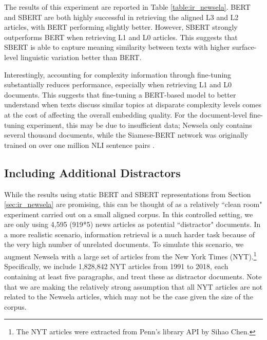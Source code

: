 \documentclass[thesis.tex]{subfiles}
\begin{document}
The results of this experiment are reported in Table \ref{table:ir_newsela}. BERT and SBERT are both highly successful in retrieving the aligned L3 and L2 articles, with BERT performing slightly better. However, SBERT strongly outperforms BERT when retrieving L1 and L0 articles. This suggests that SBERT is able to capture meaning similarity between texts with higher surface-level linguistic variation better than BERT.

Interestingly, accounting for complexity information through fine-tuning substantially reduces performance, especially when retrieving L1 and L0 documents. This suggests that fine-tuning a BERT-based model to better understand when texts discuss similar topics at disparate complexity levels comes at the cost of affecting the overall embedding quality. For the document-level fine-tuning experiment, this may be due to insufficient data; Newsela only contains several thousand documents, while the Siamese-BERT network was originally trained on over one million NLI sentence pairs \citep{reimers2019sentence}.

\subsection{Including Additional Distractors}

While the results using static BERT and SBERT representations from Section \ref{sec:ir_newsela} are promising, this can be thought of as a relatively ``clean room" experiment carried out on a small aligned corpus. In this controlled setting, we are only using 4,595 (919*5) news articles as potential ``distractor" documents. In a more realistic scenario, information retrieval is a much harder task because of the very high number of unrelated documents. To simulate this scenario, we augment Newsela with a large set of articles from the New York Times (NYT).\footnote{The NYT articles were extracted from Penn's library API by Sihao Chen.} Specifically, we include 1,828,842 NYT articles from 1991 to 2018, each containing at least five paragraphs, and treat these as distractor documents. Note that we are making the relatively strong assumption that all NYT articles are not related to the Newsela articles, which may not be the case given the size of the corpus.
\end{document}
